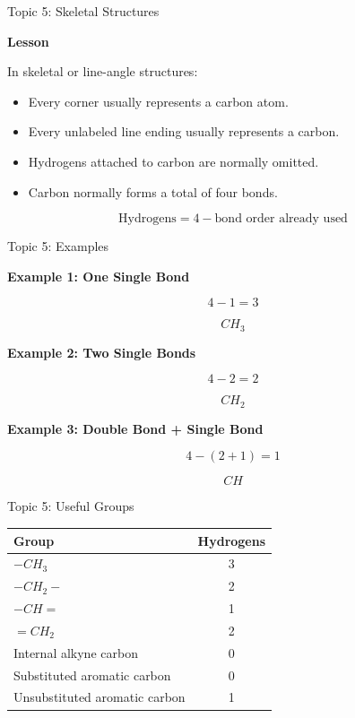 \documentclass[aspectratio=169]{beamer}
\begin{document}
\begin{frame}[t]{Topic 5: Skeletal Structures}
\small

\textbf{Lesson}

In skeletal or line-angle structures:

\begin{itemize}
    \setlength{\itemsep}{0.06cm}
    \item Every corner usually represents a carbon atom.
    \item Every unlabeled line ending usually represents a carbon.
    \item Hydrogens attached to carbon are normally omitted.
    \item Carbon normally forms a total of four bonds.
\end{itemize}

\[
\text{Hydrogens}
=
4-\text{bond order already used}
\]

\end{frame}

\begin{frame}[t]{Topic 5: Examples}
\small

\textbf{Example 1: One Single Bond}

\[
4-1=3
\]

\[
\boxed{CH_3}
\]

\textbf{Example 2: Two Single Bonds}

\[
4-2=2
\]

\[
\boxed{CH_2}
\]

\textbf{Example 3: Double Bond + Single Bond}

\[
4-(2+1)=1
\]

\[
\boxed{CH}
\]

\end{frame}

\begin{frame}[t]{Topic 5: Useful Groups}
\small

\begin{center}
\renewcommand{\arraystretch}{1.25}
\begin{tabular}{lc}
\toprule
\textbf{Group} & \textbf{Hydrogens} \\
\midrule
$-CH_3$ & 3 \\
$-CH_2-$ & 2 \\
$-CH=$ & 1 \\
$=CH_2$ & 2 \\
Internal alkyne carbon & 0 \\
Substituted aromatic carbon & 0 \\
Unsubstituted aromatic carbon & 1 \\
\bottomrule
\end{tabular}
\end{center}

\end{frame}
\end{document}
